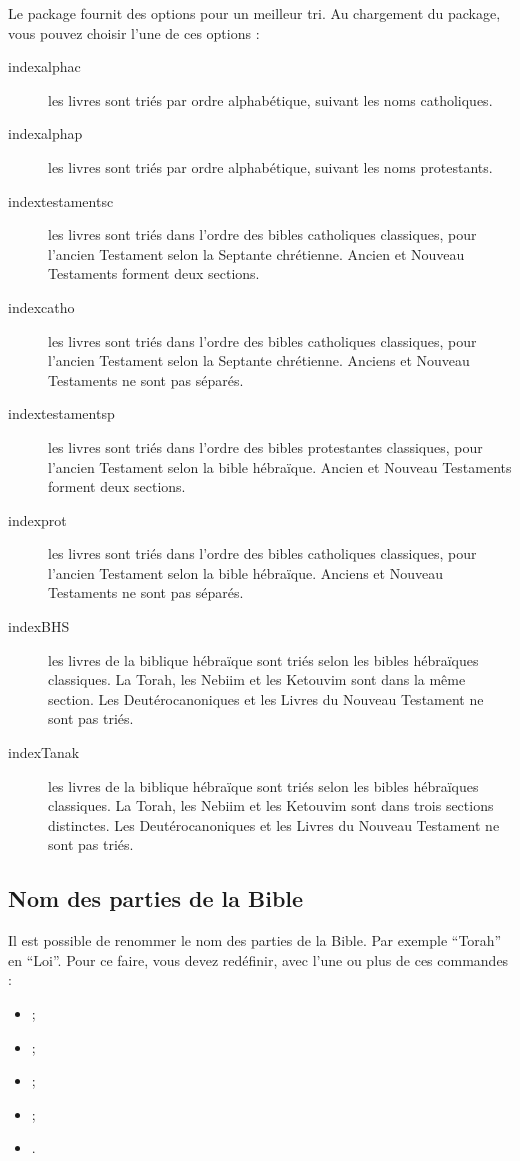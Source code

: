 \documentclass{ltxdoc}
\begin{document}
Le package fournit des options pour un meilleur tri. Au chargement du package, vous pouvez choisir l'une de ces options :
 \begin{description}
 \item[indexalphac]les livres sont triés par ordre alphabétique, suivant les noms catholiques.
\item[indexalphap]les livres sont triés par ordre alphabétique, suivant les noms protestants.
\item[indextestamentsc]les livres sont triés dans l'ordre des bibles catholiques classiques, pour l'ancien Testament  selon la Septante chrétienne. Ancien et Nouveau Testaments forment deux sections.
\item[indexcatho]les livres sont triés dans l'ordre des bibles catholiques classiques, pour l'ancien Testament  selon la Septante chrétienne. Anciens et Nouveau Testaments ne sont pas séparés.
\item[indextestamentsp]les livres sont triés dans l'ordre des bibles protestantes classiques, pour l'ancien Testament  selon la bible hébraïque. Ancien et Nouveau Testaments forment deux sections.
\item[indexprot]les livres sont triés dans l'ordre des bibles catholiques classiques, pour l'ancien Testament  selon la bible hébraïque. Anciens et Nouveau Testaments ne sont pas séparés.
\item[indexBHS]les livres de la biblique hébraïque sont triés selon les bibles hébraïques classiques. La Torah, les Nebiim et les Ketouvim sont dans la même section. Les Deutérocanoniques et les Livres du Nouveau Testament ne sont pas triés.
\item[indexTanak]les livres de la biblique hébraïque sont triés selon les bibles hébraïques classiques. La Torah, les Nebiim et les Ketouvim sont dans trois sections distinctes. Les Deutérocanoniques et les Livres du Nouveau Testament ne sont pas triés.
\end{description}

\subsection{Nom des parties de la Bible}
Il est possible de renommer le nom des parties de la Bible. Par exemple \enquote{Torah} en \enquote{Loi}.
Pour ce faire, vous devez redéfinir, avec   l'une ou plus de ces commandes :
 \begin{itemize}
 \item {} ;
 \item {} ;
 \item {} ;
 \item {};
 \item {}.
\end{itemize}
\end{document}
